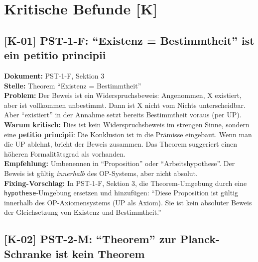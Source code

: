 \documentclass[11pt,a4paper]{article}
\newcommand{\K}[1]{\textbf{[K-#1]}}
\newcommand{\Dok}[1]{\textbf{Dokument:} #1\\}
\newcommand{\Stelle}[1]{\textbf{Stelle:} #1\\}
\newcommand{\Prob}[1]{\textbf{Problem:} #1\\}
\newcommand{\Krit}[1]{\textbf{Warum kritisch:} #1\\}
\newcommand{\Empf}[1]{\textbf{Empfehlung:} #1\\}
\newcommand{\Fix}[1]{\textbf{Fixing-Vorschlag:} #1\\}
\begin{document}
\newpage

\section{Kritische Befunde [K]}

\subsection{\K{01} PST-1-F: ``Existenz = Bestimmtheit'' ist ein petitio principii}

\Dok{PST-1-F, Sektion 3}
\Stelle{Theorem ``Existenz = Bestimmtheit''}
\Prob{Der Beweis ist ein Widerspruchsbeweis: Angenommen, X existiert,
aber ist vollkommen unbestimmt. Dann ist X nicht vom Nichts
unterscheidbar. Aber ``existiert'' in der Annahme setzt bereits
Bestimmtheit voraus (per UP).}
\Krit{Dies ist kein Widerspruchsbeweis im strengen Sinne, sondern eine
\textbf{petitio principii}: Die Konklusion ist in die Pr\"{a}misse
eingebaut. Wenn man die UP ablehnt, bricht der Beweis zusammen. Das
Theorem suggeriert einen h\"{o}heren Formalit\"{a}tsgrad als
vorhanden.}
\Empf{Umbenennen in ``Proposition'' oder ``Arbeitshypothese''. Der
Beweis ist g\"{u}ltig \emph{innerhalb} des OP-Systems, aber nicht
absolut.}
\Fix{In PST-1-F, Sektion 3, die Theorem-Umgebung durch eine
\texttt{hypothese}-Umgebung ersetzen und hinzuf\"{u}gen: ``Diese
Proposition ist g\"{u}ltig innerhalb des OP-Axiomensystems (UP als
Axiom). Sie ist kein absoluter Beweis der Gleichsetzung von Existenz
und Bestimmtheit.''}

\subsection{\K{02} PST-2-M: ``Theorem'' zur Planck-Schranke ist kein Theorem}
\end{document}
